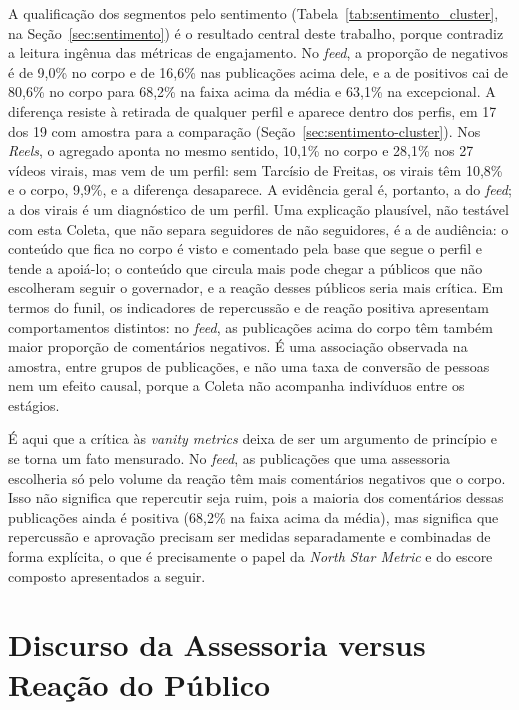 A qualificação dos segmentos pelo sentimento (Tabela~\ref{tab:sentimento_cluster}, na Seção~\ref{sec:sentimento}) é o resultado central deste trabalho, porque contradiz a leitura ingênua das métricas de engajamento. No \emph{feed}, a proporção de negativos é de 9,0\% no corpo e de 16,6\% nas publicações acima dele, e a de positivos cai de 80,6\% no corpo para 68,2\% na faixa acima da média e 63,1\% na excepcional. A diferença resiste à retirada de qualquer perfil e aparece dentro dos perfis, em 17 dos 19 com amostra para a comparação (Seção~\ref{sec:sentimento-cluster}). Nos \emph{Reels}, o agregado aponta no mesmo sentido, 10,1\% no corpo e 28,1\% nos 27 vídeos virais, mas vem de um perfil: sem Tarcísio de Freitas, os virais têm 10,8\% e o corpo, 9,9\%, e a diferença desaparece. A evidência geral é, portanto, a do \emph{feed}; a dos virais é um diagnóstico de um perfil. Uma explicação plausível, não testável com esta Coleta, que não separa seguidores de não seguidores, é a de audiência: o conteúdo que fica no corpo é visto e comentado pela base que segue o perfil e tende a apoiá-lo; o conteúdo que circula mais pode chegar a públicos que não escolheram seguir o governador, e a reação desses públicos seria mais crítica. Em termos do funil, os indicadores de repercussão e de reação positiva apresentam comportamentos distintos: no \emph{feed}, as publicações acima do corpo têm também maior proporção de comentários negativos. É uma associação observada na amostra, entre grupos de publicações, e não uma taxa de conversão de pessoas nem um efeito causal, porque a Coleta não acompanha indivíduos entre os estágios.

É aqui que a crítica às \emph{vanity metrics} \cite{feroz2024} deixa de ser um argumento de princípio e se torna um fato mensurado. No \emph{feed}, as publicações que uma assessoria escolheria só pelo volume da reação têm mais comentários negativos que o corpo. Isso não significa que repercutir seja ruim, pois a maioria dos comentários dessas publicações ainda é positiva (68,2\% na faixa acima da média), mas significa que repercussão e aprovação precisam ser medidas separadamente e combinadas de forma explícita, o que é precisamente o papel da \emph{North Star Metric} e do escore composto apresentados a seguir.


\section{Discurso da Assessoria versus Reação do Público}\label{sec:discurso-reacao}

